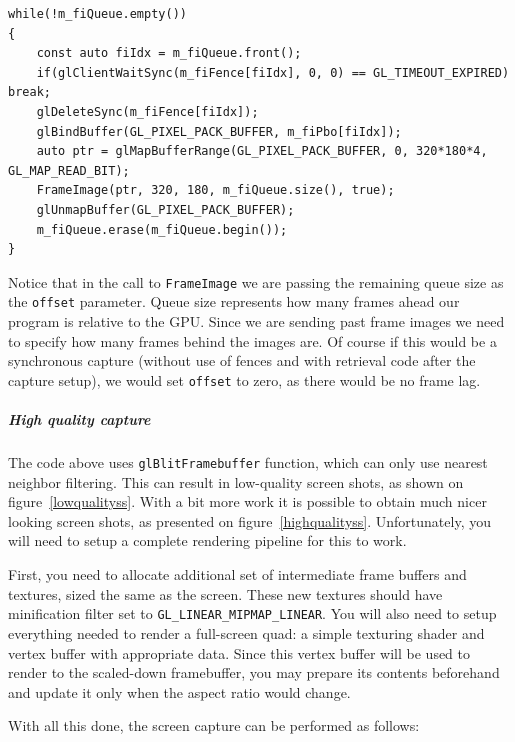 \documentclass[hidelinks,titlepage,a4paper]{article}
\begin{document}
\begin{lstlisting}
while(!m_fiQueue.empty())
{
    const auto fiIdx = m_fiQueue.front();
    if(glClientWaitSync(m_fiFence[fiIdx], 0, 0) == GL_TIMEOUT_EXPIRED) break;
    glDeleteSync(m_fiFence[fiIdx]);
    glBindBuffer(GL_PIXEL_PACK_BUFFER, m_fiPbo[fiIdx]);
    auto ptr = glMapBufferRange(GL_PIXEL_PACK_BUFFER, 0, 320*180*4, GL_MAP_READ_BIT);
    FrameImage(ptr, 320, 180, m_fiQueue.size(), true);
    glUnmapBuffer(GL_PIXEL_PACK_BUFFER);
    m_fiQueue.erase(m_fiQueue.begin());
}
\end{lstlisting}

Notice that in the call to \texttt{FrameImage} we are passing the remaining queue size as the \texttt{offset} parameter. Queue size represents how many frames ahead our program is relative to the GPU. Since we are sending past frame images we need to specify how many frames behind the images are. Of course if this would be a synchronous capture (without use of fences and with retrieval code after the capture setup), we would set \texttt{offset} to zero, as there would be no frame lag.

\subparagraph{High quality capture}

The code above uses \texttt{glBlitFramebuffer} function, which can only use nearest neighbor filtering. This can result in low-quality screen shots, as shown on figure~\ref{lowqualityss}. With a bit more work it is possible to obtain much nicer looking screen shots, as presented on figure~\ref{highqualityss}. Unfortunately, you will need to setup a complete rendering pipeline for this to work.

First, you need to allocate additional set of intermediate frame buffers and textures, sized the same as the screen. These new textures should have minification filter set to \texttt{GL\_LINEAR\_MIPMAP\_LINEAR}. You will also need to setup everything needed to render a full-screen quad: a simple texturing shader and vertex buffer with appropriate data. Since this vertex buffer will be used to render to the scaled-down framebuffer, you may prepare its contents beforehand and update it only when the aspect ratio would change.

With all this done, the screen capture can be performed as follows:
\end{document}
